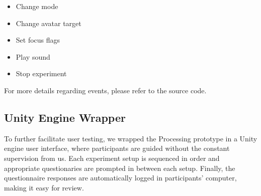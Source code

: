 \begin{itemize}
    \item Change mode
    \item Change avatar target
    \item Set focus flags
    \item Play sound
    \item Stop experiment
\end{itemize}

For more details regarding events, please refer to the source code.

\subsection{Unity Engine Wrapper}

To further facilitate user testing, we wrapped the Processing prototype in a Unity engine user interface, where participants are guided without the constant supervision from us. Each experiment setup is sequenced in order and appropriate questionaries are prompted in between each setup. Finally, the questionnaire responses are automatically logged in participants’ computer, making it easy for review.
